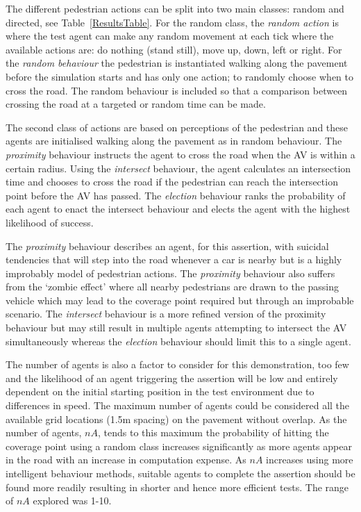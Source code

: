 \documentclass[letterpaper, 10 pt, journal, twoside]{IEEEtran}
\begin{document}
The different pedestrian actions can be split into two main classes: random and directed, see Table~\ref{ResultsTable}. For the random class, the \textit{random action} is where the test agent can make any random movement at each tick where the available actions are: do nothing (stand still), move up, down, left or right. For the \textit{random behaviour} the pedestrian is instantiated walking along the pavement before the simulation starts and has only one action; to randomly choose when to cross the road. The random behaviour is included so that a comparison between crossing the road at a targeted or random time can be made. 

The second class of actions are based on perceptions of the pedestrian and these agents are initialised walking along the pavement as in random behaviour. The \textit{proximity} behaviour instructs the agent to cross the road when the AV is within a certain radius. Using the \textit{intersect} behaviour, the agent calculates an intersection time and chooses to cross the road if the pedestrian can reach the intersection point before the AV has passed. The \textit{election} behaviour ranks the probability of each agent to enact the intersect behaviour and elects the agent with the highest likelihood of success.

The \textit{proximity} behaviour describes an agent, for this assertion, with suicidal tendencies that will step into the road whenever a car is nearby but is a highly improbably model of pedestrian actions. The \textit{proximity} behaviour also suffers from the `zombie effect' where all nearby pedestrians are drawn to the passing vehicle which may lead to the coverage point required but through an improbable scenario. The \textit{intersect} behaviour is a more refined version of the proximity behaviour but may still result in multiple agents attempting to intersect the AV simultaneously whereas the \textit{election} behaviour should limit this to a single agent.

The number of agents is also a factor to consider for this demonstration, too few and the likelihood of an agent triggering the assertion will be low and entirely dependent on the initial starting position in the test environment due to differences in speed. The maximum number of agents could be considered all the available grid locations (1.5m spacing) on the pavement without overlap.
As the number of agents, $nA$, tends to this maximum the probability of hitting the coverage point using a random class increases significantly as more agents appear in the road with an increase in computation expense. As $nA$ increases using more intelligent behaviour methods, suitable agents to complete the assertion should be found more readily resulting in shorter and hence more efficient tests. The range of $nA$  explored was 1-10.
\end{document}
